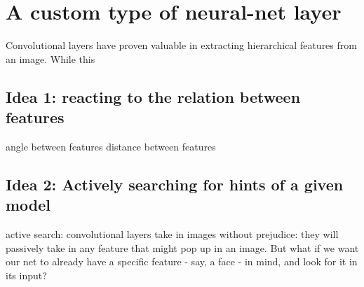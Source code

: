 \section{A custom type of neural-net layer}

Convolutional layers have proven valuable in extracting hierarchical features from an image. While this 

\subsection{Idea 1: reacting to the relation between features}
angle between features
distance between features


\subsection{Idea 2: Actively searching for hints of a given model}
active search: convolutional layers take in images without prejudice: they will passively take in any feature that might pop up in an image. But what if we want our net to already have a specific feature - say, a face - in mind, and look for it in its input?
